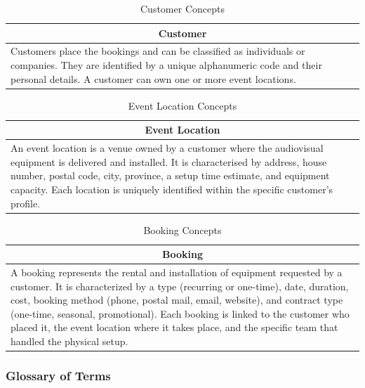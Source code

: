 \documentclass[12pt]{article}
\begin{document}
\begin{table}[H] 
\renewcommand{\arraystretch}{1.3} 
\begin{tabularx}{\textwidth}{|X|} 
\hline \multicolumn{1}{|c|}{\textbf{Customer}} \\ \hline 
Customers place the bookings and can be classified as individuals or companies. They are identified by a unique alphanumeric code and their personal details. A customer can own one or more event locations. \\ \hline 
\end{tabularx} 
\caption{Customer Concepts} 
\end{table} 

\begin{table}[H] 
\renewcommand{\arraystretch}{1.3} 
\begin{tabularx}{\textwidth}{|X|} 
\hline \multicolumn{1}{|c|}{\textbf{Event Location}} \\ \hline 
An event location is a venue owned by a customer where the audiovisual equipment is delivered and installed. It is characterised by address, house number, postal code, city, province, a setup time estimate, and equipment capacity. Each location is uniquely identified within the specific customer's profile. \\ \hline 
\end{tabularx} 
\caption{Event Location Concepts} 
\end{table} 

\begin{table}[H] 
\renewcommand{\arraystretch}{1.3} 
\begin{tabularx}{\textwidth}{|X|} 
\hline \multicolumn{1}{|c|}{\textbf{Booking}} \\ \hline 
A booking represents the rental and installation of equipment requested by a customer. It is characterized by a type (recurring or one-time), date, duration, cost, booking method (phone, postal mail, email, website), and contract type (one-time, seasonal, promotional). Each booking is linked to the customer who placed it, the event location where it takes place, and the specific team that handled the physical setup. \\ \hline 
\end{tabularx} 
\caption{Booking Concepts} 
\end{table}
\subsubsection{Glossary of Terms}
\end{document}

